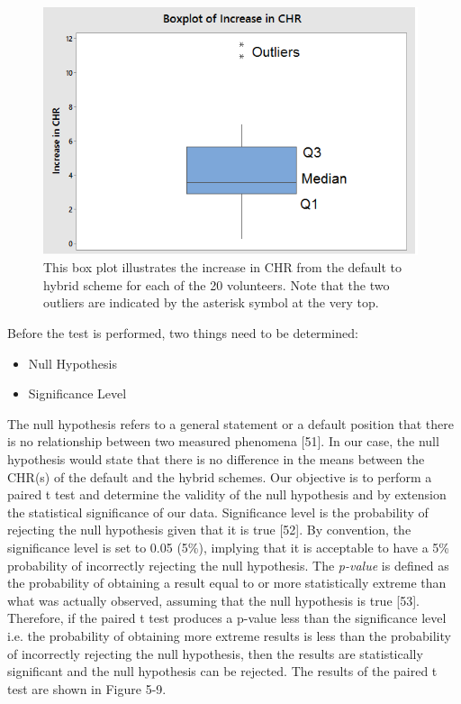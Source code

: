 \documentclass[12pt]{uthesis-v12}  %
\begin{document}
			\begin{figure}[h]
				\centering
				\includegraphics[width = 110mm]{images/chrDifferences.png}
				\caption[Relative Increase in CHR - Chart]{This box plot illustrates the increase in CHR from the default to hybrid scheme for each of the 20 volunteers. Note that the two outliers are indicated by the asterisk symbol at the very top.}
			\end{figure}
			
			Before the test is performed, two things need to be determined:
			\begin{itemize}
				\item Null Hypothesis
				\item Significance Level
			\end{itemize}
			
			The null hypothesis refers to a general statement or a default position that there is no relationship between two measured phenomena [51]. In our case, the null hypothesis would state that there is no difference in the means between the CHR(s) of the default and the hybrid schemes. Our objective is to perform a paired t test and determine the validity of the null hypothesis and by extension the statistical significance of our data. Significance level is the probability of rejecting the null hypothesis given that it is true [52]. By convention, the significance level is set to 0.05 (5\%), implying that it is acceptable to have a 5\% probability of incorrectly rejecting the null hypothesis. The {\em p-value} is defined as the probability of obtaining a result equal to or more statistically extreme than what was actually observed, assuming that the null hypothesis is true [53]. Therefore, if the paired t test produces a p-value less than the significance level i.e. the probability of obtaining more extreme results is less than the probability of incorrectly rejecting the null hypothesis, then the results are statistically significant and the null hypothesis can be rejected. The results of the paired t test are shown in Figure 5-9.
			
\end{document}
